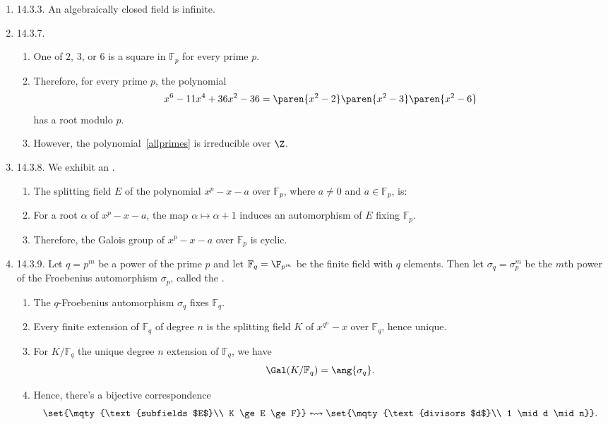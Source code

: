 \documentclass[onesided]{ccg-pset}
\newcommand{\Fp}{\mathbb{F}_p} %
\newcommand{\Fq}{\mathbb{F}_q} %
\begin{document}
\begin{enumerate}
\item \label{14.3.3} 14.3.3.
An algebraically closed field is infinite.


\item \label{14.3.7} 14.3.7.
\begin{enumerate}
    \item One of $2$, $3$, or $6$ is a square in $\Fp$ for every prime $p$.
    \item Therefore, for every prime $p$, the polynomial 
        \begin{equation}
            \label{allprimes}
        x^6 - 11x^{4} + 36x^{2} - 36 = \paren{x^{2} -2} \paren{x^{2} -3} \paren{x^{2} -6} 
        \end{equation}
        has a root modulo $p$.
    \item However, the polynomial~\eqref{allprimes} is irreducible over $\Z$.
\end{enumerate}


\item \label{14.3.8} 14.3.8. We exhibit an .
\begin{enumerate}
    \item The splitting field $E$ of the polynomial $x^p - x -a$ over $\Fp$, where $a \neq 0$ and $a \in \Fp$, is:
    \item For a root $\alpha$ of $x^p - x -a$, the map $\alpha \mapsto \alpha + 1$ induces an automorphism of $E$ fixing $\Fp$.
    \item Therefore, the Galois group of $x^p - x -a$ over $\Fp$ is cyclic.
\end{enumerate}
 
\item \label{14.3.9} 14.3.9.
Let $q = p^m$ be a power of the prime $p$ and let $\Fq = \F_{p^m}$ be the finite field with $q$ elements. Then let $\sigma_q = \sigma_p^m$ be the $m$th power of the Froebenius automorphism $\sigma_p$, called the .

\begin{enumerate}
    \item The $q$-Froebenius automorphism $\sigma_q$ fixes $\Fq$.
    \item Every finite extension of $\Fq$ of degree $n$ is the splitting field $K$ of $x^{q^n} -x$ over $\Fq$, hence unique.
    \item For $K/\Fq$ the unique degree $n$ extension of $\Fq$, we have 
    \[
        \Gal(K/\Fq) = \ang{\sigma_q}
    .\]
    \item Hence, there's a bijective correspondence
    \[
        \set{\mqty{\text{subfields $E$}\\
                    K \ge E \ge F}} 
            \leftrightsquigarrow 
        \set{\mqty{\text{divisors $d$}\\
                   1 \mid d \mid n}}
    .\]
\end{enumerate}
 

\end{enumerate}
\end{document}
